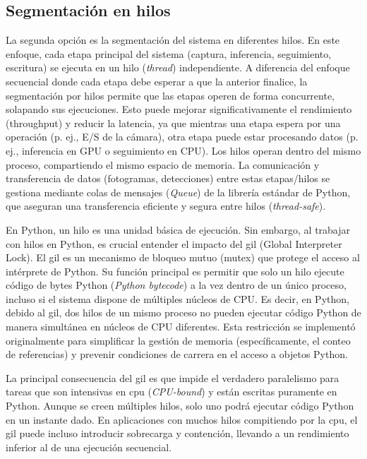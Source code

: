 \documentclass[11pt,spanish,listoffigures,listoftables]{tfgetsinf}
\begin{document}
\subsection{Segmentación en hilos} \label{sub:segmentacion_hilos}

La segunda opción es la segmentación del sistema en diferentes hilos. En este enfoque, cada etapa principal del sistema (captura, inferencia, seguimiento, escritura) se ejecuta en un hilo (\textit{thread}) independiente. A diferencia del enfoque secuencial donde cada etapa debe esperar a que la anterior finalice, la segmentación por hilos permite que las etapas operen de forma concurrente, solapando sus ejecuciones. Esto puede mejorar significativamente el rendimiento (throughput) y reducir la latencia, ya que mientras una etapa espera por una operación (p. ej., E/S de la cámara), otra etapa puede estar procesando datos (p. ej., inferencia en GPU o seguimiento en CPU). Los hilos operan dentro del mismo proceso, compartiendo el mismo espacio de memoria. La comunicación y transferencia de datos (fotogramas, detecciones) entre estas etapas/hilos se gestiona mediante colas de mensajes (\textit{Queue}) de la librería estándar de Python, que aseguran una transferencia eficiente y segura entre hilos (\textit{thread-safe}).


En Python, un hilo es una unidad básica de ejecución. Sin embargo, al trabajar con hilos en Python, es crucial entender el impacto del \gls{gil} (Global Interpreter Lock). El \gls{gil} es un mecanismo de bloqueo mutuo (mutex) que protege el acceso al intérprete de Python. Su función principal es permitir que solo un hilo ejecute código de bytes Python (\textit{Python bytecode}) a la vez dentro de un único proceso, incluso si el sistema dispone de múltiples núcleos de CPU. Es decir, en Python, debido al \gls{gil}, dos hilos de un mismo proceso no pueden ejecutar código Python de manera simultánea en núcleos de CPU diferentes. Esta restricción se implementó originalmente para simplificar la gestión de memoria (específicamente, el conteo de referencias) y prevenir condiciones de carrera en el acceso a objetos Python.

La principal consecuencia del \gls{gil} es que impide el verdadero paralelismo para tareas que son intensivas en \gls{cpu} (\textit{CPU-bound}) y están escritas puramente en Python. Aunque se creen múltiples hilos, solo uno podrá ejecutar código Python en un instante dado. En aplicaciones con muchos hilos compitiendo por la \gls{cpu}, el \gls{gil} puede incluso introducir sobrecarga y contención, llevando a un rendimiento inferior al de una ejecución secuencial.
\end{document}
